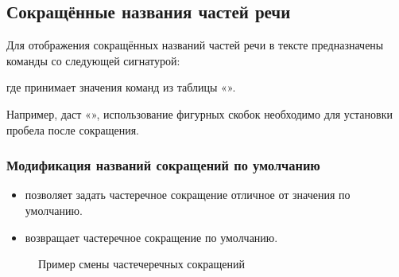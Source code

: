 \subsection{Сокращённые названия частей речи}

Для отображения сокращённых названий частей речи в тексте предназначены команды со следующей сигнатурой:
\ExplSyntaxOn
\begin{signature}
    \manModifier[cmd] \manColon{} 
\end{signature}
\ExplSyntaxOff
где  принимает значения команд из таблицы «».

Например, \manCode{\manModifier*[rsNounAcr]\manReq{}} даст «\rsNounAcr{}», использование фигурных скобок необходимо для установки пробела после сокращения.


\subsubsection{Модификация названий сокращений по умолчанию}


\begin{itemize}
    \item \manModifier[rsSetAcr] позволяет задать частеречное сокращение отличное от значения по умолчанию.
        \ExplSyntaxOn
        \begin{signature}
            \manModifier[cmd] \manColon{}
            \manOpt{ \manArg[язык:tl] }
            \manReq{ \manArg[сокращение:tl]  }
        \end{signature}
        \ExplSyntaxOff
    \item \manModifier[rsResetAcr] возвращает частеречное сокращение по умолчанию.
        \ExplSyntaxOn
        \begin{signature}
            \manModifier[cmd] \manColon{}
            \manOpt{ \manArg[язык:tl] }
        \end{signature}
        \ExplSyntaxOff
\end{itemize}


\begin{figure}[H]
    \centering
    \begin{minipage}[c]{0.5\textwidth}
        \begin{Latexcode}
        \end{Latexcode}
    \end{minipage}
    \hfill
    \begin{minipage}[c]{0.4\textwidth}
        \small
    \end{minipage}

    \caption{Пример смены частечеречных сокращений}
\end{figure}


